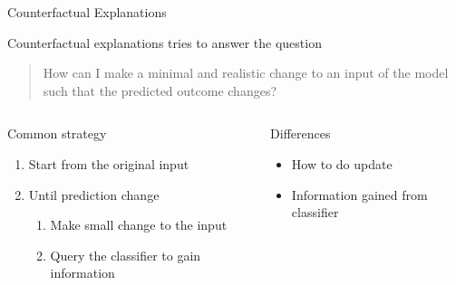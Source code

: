 \begin{frame}{Counterfactual Explanations}

	Counterfactual explanations tries to answer the question 
	\vspace{1em}

	\begin{quote}
		How can I make a \alert{minimal} and \alert{realistic} change to an input of the model such that the predicted outcome changes?
	\end{quote}
	\vspace{1em}

	\begin{columns}
		\begin{column}{0.5\textwidth}
			\alert{Common strategy}
			\begin{enumerate}
				\item Start from the original input
				\item Until prediction change
					\begin{enumerate}
						\item Make small change to the input
						\item Query the classifier to gain information
					\end{enumerate}
			\end{enumerate}
		\end{column}
		\begin{column}{0.5\textwidth}
			\alert{Differences}
			\begin{itemize}
				\item How to do update
				\item Information gained from classifier
			\end{itemize}
		\end{column}
	\end{columns}

\end{frame}




